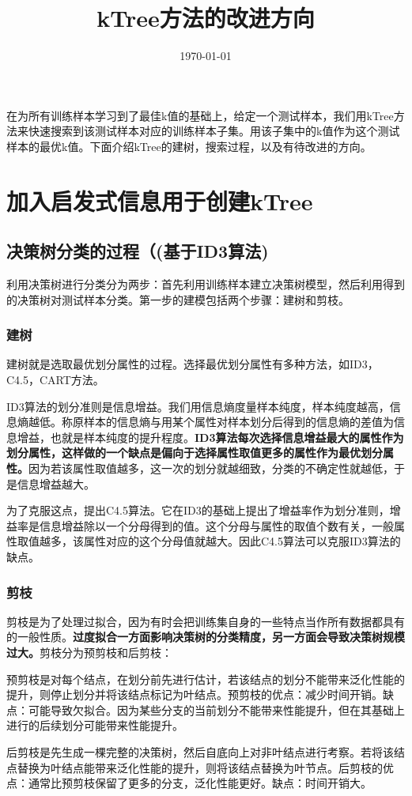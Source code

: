 \documentclass{ctexart}
\title{kTree方法的改进方向}
\date{\today}
\begin{document}
	\maketitle
	在为所有训练样本学习到了最佳k值的基础上，给定一个测试样本，我们用kTree方法来快速搜索到该测试样本对应的训练样本子集。用该子集中的k值作为这个测试样本的最优k值。下面介绍kTree的建树，搜索过程，以及有待改进的方向。
	\section{加入启发式信息用于创建kTree}
	\subsection{决策树分类的过程（(基于ID3算法)}
	利用决策树进行分类分为两步：首先利用训练样本建立决策树模型，然后利用得到的决策树对测试样本分类。第一步的建模包括两个步骤：建树和剪枝。
	\subsubsection{建树}
	建树就是选取最优划分属性的过程。选择最优划分属性有多种方法，如ID3，C4.5，CART方法。
	
	ID3算法的划分准则是信息增益。我们用信息熵度量样本纯度，样本纯度越高，信息熵越低。称原样本的信息熵与用某个属性对样本划分后得到的信息熵的差值为信息增益，也就是样本纯度的提升程度。{\bfseries ID3算法每次选择信息增益最大的属性作为划分属性，这样做的一个缺点是偏向于选择属性取值更多的属性作为最优划分属性。}因为若该属性取值越多，这一次的划分就越细致，分类的不确定性就越低，于是信息增益越大。
	
	为了克服这点，提出C4.5算法。它在ID3的基础上提出了增益率作为划分准则，增益率是信息增益除以一个分母得到的值。这个分母与属性的取值个数有关，一般属性取值越多，该属性对应的这个分母值就越大。因此C4.5算法可以克服ID3算法的缺点。
	\subsubsection{剪枝}
	剪枝是为了处理过拟合，因为有时会把训练集自身的一些特点当作所有数据都具有的一般性质。{\bfseries 过度拟合一方面影响决策树的分类精度，另一方面会导致决策树规模过大。}剪枝分为预剪枝和后剪枝：
	
	预剪枝是对每个结点，在划分前先进行估计，若该结点的划分不能带来泛化性能的提升，则停止划分并将该结点标记为叶结点。预剪枝的优点：减少时间开销。缺点：可能导致欠拟合。因为某些分支的当前划分不能带来性能提升，但在其基础上进行的后续划分可能带来性能提升。
	
	后剪枝是先生成一棵完整的决策树，然后自底向上对非叶结点进行考察。若将该结点替换为叶结点能带来泛化性能的提升，则将该结点替换为叶节点。后剪枝的优点：通常比预剪枝保留了更多的分支，泛化性能更好。缺点：时间开销大。
\end{document}
